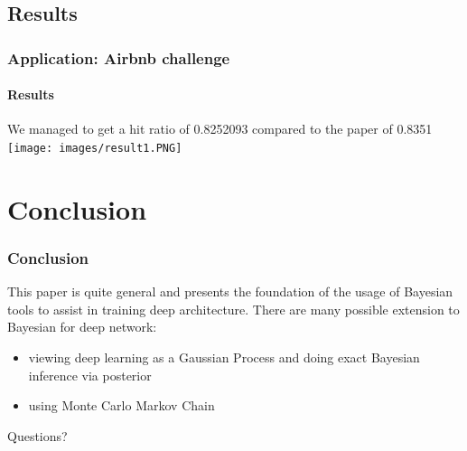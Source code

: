 \documentclass{beamer}
\begin{document}
\subsection{Results}
\begin{frame}
\frametitle{Application: Airbnb challenge}
\framesubtitle{Results}
We managed to get a hit ratio of 0.8252093 compared to the paper of 0.8351
\texttt{[image: images/result1.PNG]} 
\end{frame}



\section{Conclusion}
\begin{frame}
\frametitle{Conclusion}
This paper is quite general and presents the foundation of the usage of Bayesian tools to assist in training deep architecture.
There are many possible extension to Bayesian for deep network:
\begin{itemize}
\item viewing deep learning as a Gaussian Process and doing exact Bayesian inference via posterior
\item using Monte Carlo Markov Chain
\end{itemize}
\end{frame}



\begin{frame}
\Huge{\centerline{Questions?}}
\end{frame}
\end{document}
